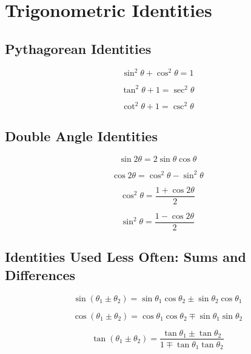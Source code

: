 \documentclass[12pt]{article}
\begin{document}
\section*{Trigonometric Identities}


\vspace{5mm}

\subsection*{Pythagorean Identities}

$$\sin^2\theta+\cos^2\theta=1$$

$$\tan^2\theta+1=\sec^2\theta$$

$$\cot^2\theta+1=\csc^2\theta$$

\subsection*{Double Angle Identities}

$$\sin2\theta=2\sin\theta\cos\theta$$

$$\cos2\theta=\cos^2\theta-\sin^2\theta$$

$$\cos^2\theta=\frac{1+\cos 2\theta}{2}$$

$$\sin^2\theta=\frac{1-\cos2\theta}{2}$$

\subsection*{Identities Used Less Often: Sums and Differences}

\vspace{3mm}

$$\sin\left(\theta_1\pm\theta_2\right)=\sin\theta_1\cos\theta_2\pm\sin\theta_2\cos\theta_1$$

$$\cos\left(\theta_1\pm\theta_2\right)=\cos\theta_1\cos\theta_2\mp\sin\theta_1\sin\theta_2$$

$$\tan\left(\theta_1\pm\theta_2\right)=\frac{\tan\theta_1\pm\tan\theta_2}{1\mp\tan\theta_1\tan\theta_2}$$
\end{document}
